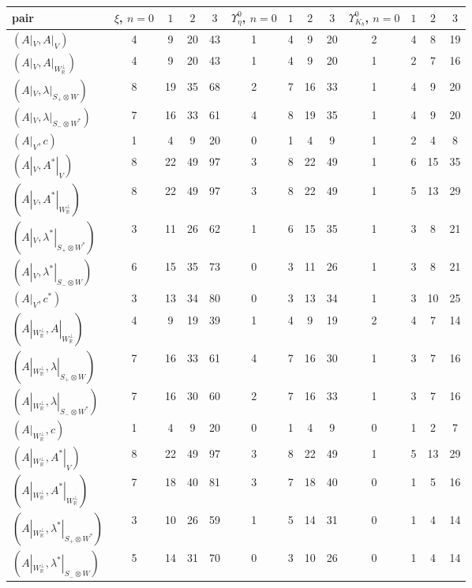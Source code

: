 \begin{tabular}{l|cccc|cccc|cccc}
pair & $\xi$, $n=0$ & $1$ & $2$ & $3$ & $\Upsilon^0_\eta$, $n=0$ & $1$ & $2$ & $3$ & $\Upsilon^0_{K_b}$, $n=0$ & $1$ & $2$ & $3$\\
\hline
$(A|_V,A|_V)$ & 4 & 9 & 20 & 43 & 1 & 4 & 9 & 20 & 2 & 4 & 8 & 19\\
$(A|_V,A|_{W_{\mathbb R}^\perp})$ & 4 & 9 & 20 & 43 & 1 & 4 & 9 & 20 & 1 & 2 & 7 & 16\\
$(A|_V,\lambda|_{S_+\otimes W})$ & 8 & 19 & 35 & 68 & 2 & 7 & 16 & 33 & 1 & 4 & 9 & 20\\
$(A|_V,\lambda|_{S_-\otimes W^*})$ & 7 & 16 & 33 & 61 & 4 & 8 & 19 & 35 & 1 & 4 & 9 & 20\\
$(A|_V,c)$ & 1 & 4 & 9 & 20 & 0 & 1 & 4 & 9 & 1 & 2 & 4 & 8\\
$(A|_V,A^*|_V)$ & 8 & 22 & 49 & 97 & 3 & 8 & 22 & 49 & 1 & 6 & 15 & 35\\
$(A|_V,A^*|_{W_{\mathbb R}^\perp})$ & 8 & 22 & 49 & 97 & 3 & 8 & 22 & 49 & 1 & 5 & 13 & 29\\
$(A|_V,\lambda^*|_{S_+\otimes W^*})$ & 3 & 11 & 26 & 62 & 1 & 6 & 15 & 35 & 1 & 3 & 8 & 21\\
$(A|_V,\lambda^*|_{S_-\otimes W})$ & 6 & 15 & 35 & 73 & 0 & 3 & 11 & 26 & 1 & 3 & 8 & 21\\
$(A|_V,c^*)$ & 3 & 13 & 34 & 80 & 0 & 3 & 13 & 34 & 1 & 3 & 10 & 25\\
$(A|_{W_{\mathbb R}^\perp},A|_{W_{\mathbb R}^\perp})$ & 4 & 9 & 19 & 39 & 1 & 4 & 9 & 19 & 2 & 4 & 7 & 14\\
$(A|_{W_{\mathbb R}^\perp},\lambda|_{S_+\otimes W})$ & 7 & 16 & 33 & 61 & 4 & 7 & 16 & 30 & 1 & 3 & 7 & 16\\
$(A|_{W_{\mathbb R}^\perp},\lambda|_{S_-\otimes W^*})$ & 7 & 16 & 30 & 60 & 2 & 7 & 16 & 33 & 1 & 3 & 7 & 16\\
$(A|_{W_{\mathbb R}^\perp},c)$ & 1 & 4 & 9 & 20 & 0 & 1 & 4 & 9 & 0 & 1 & 2 & 7\\
$(A|_{W_{\mathbb R}^\perp},A^*|_V)$ & 8 & 22 & 49 & 97 & 3 & 8 & 22 & 49 & 1 & 5 & 13 & 29\\
$(A|_{W_{\mathbb R}^\perp},A^*|_{W_{\mathbb R}^\perp})$ & 7 & 18 & 40 & 81 & 3 & 7 & 18 & 40 & 0 & 1 & 5 & 16\\
$(A|_{W_{\mathbb R}^\perp},\lambda^*|_{S_+\otimes W^*})$ & 3 & 10 & 26 & 59 & 1 & 5 & 14 & 31 & 0 & 1 & 4 & 14\\
$(A|_{W_{\mathbb R}^\perp},\lambda^*|_{S_-\otimes W})$ & 5 & 14 & 31 & 70 & 0 & 3 & 10 & 26 & 0 & 1 & 4 & 14\\

\end{tabular}
